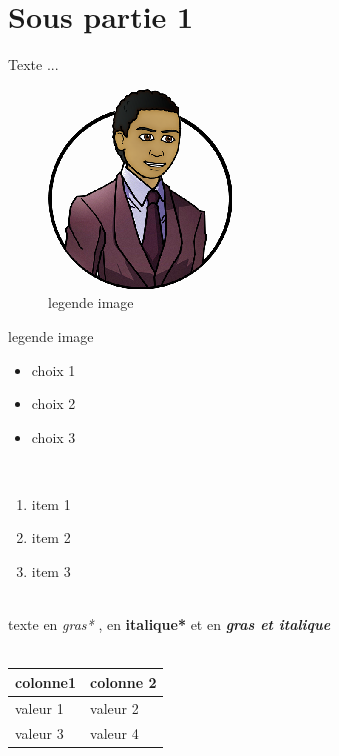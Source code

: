 \documentclass[11pt,fleqn]{book}
\begin{document}
\section{Sous partie 1}
Texte  ...
~\\
\begin{figure}[!t]
\centering
\includegraphics{./57cb4f8f0b5a8.png}
\caption{legende image}
\label{legende image}
\end{figure}
legende image
~\\
\begin{itemize}
\item choix  1
\item choix  2
\item choix  3
\end{itemize}
~\\
\begin{enumerate}
\item item  1
\item item  2
\item item  3 
\end{enumerate}
~\\
texte  en  \textit{gras*} ,  en  \textbf{italique*} et  en  \textbf{\textit{gras et italique}}
~\\
~\\
\begin{tabular}
{|l|l|}
\hline
colonne1 & colonne 2\\
\hline
valeur  1 & valeur  2\\
valeur  3 & valeur  4\\
\hline
\end{tabular}
~\\
~\\
\end{document}

